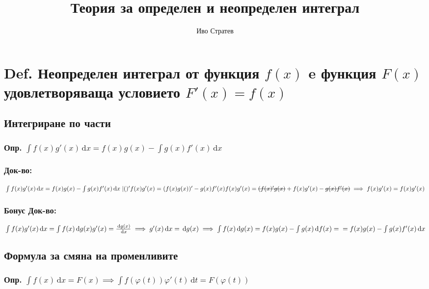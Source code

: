 \documentclass{article}
\title{Теория за определен и неопределен интеграл}
\author{Иво Стратев}
\newcommand{\dx}[1]{\,\mathrm{d}#1}
\newcommand{\stkout}[1]{\ifmmode\text{\sout{\ensuremath{#1}}}\else\sout{#1}\fi}
\begin{document}
    \maketitle
    \section{Def. Неопределен интеграл от функция \(f(x)\) e функция \(F(x)\) удовлетворяваща условието \(F'(x) = f(x)\)}
    \subsection{Интегриране по части}
    \subsubsection{Опр. \(\int f(x)g'(x)\dx{x} = f(x)g(x) - \int g(x)f'(x)\dx{x}\)}
    \subsubsection{Док-во:}
    \(\\\int f(x)g'(x)\dx{x} = f(x)g(x) - \int g(x)f'(x)\dx{x} \; |()'\\
    \\f(x)g'(x) = (f(x)g(x))' - g(x)f'(x)\\
    \\f(x)g'(x) = \stkout{(f(x)'g(x)} + f(x)g'(x) - \stkout{g(x)f'(x)}\\
    \\\implies f(x)g'(x) = f(x)g'(x)\)
    \subsubsection{Бонус Док-во:}
    \(\\\int f(x)g'(x)\dx{x} = \int f(x)\dx{g(x)}\\
    \\g'(x) = \frac{\dx{g(x)}}{\dx{x}} \implies g'(x)\dx{x} = \dx{g(x)}\\
    \\\implies \int f(x)\dx{g(x)} = f(x)g(x) - \int g(x)\dx{f(x)} =\\
    \\ = f(x)g(x) - \int g(x)f'(x)\dx{x}\)
    \subsection{Формула за смяна на променливите}
    \subsubsection{Опр. \(\int f(x)\dx{x} = F(x) \implies \int f(\varphi(t))\varphi'(t)\dx{t} = F(\varphi(t))\)}
\end{document}
